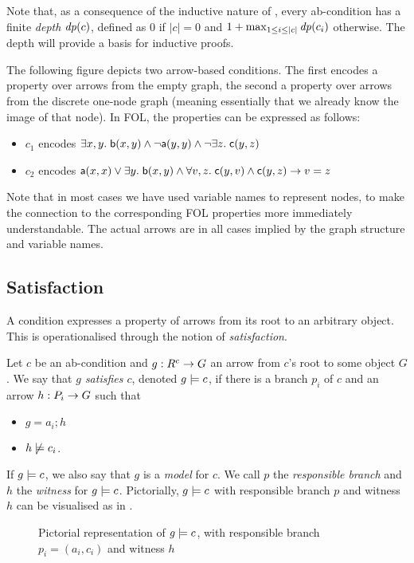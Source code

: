 Note that, as a consequence of the inductive nature of , every ab-condition has a finite \emph{depth} $\mathit{dp}(c)$, defined as $0$ if $|c|=0$ and $1+\max_{1\leq i\leq |c|} \mathit{dp}(c_i)$ otherwise. The depth will provide a basis for inductive proofs.

\begin{example}
The following figure depicts two arrow-based conditions. The first encodes a property over arrows from the empty graph, the second a property over arrows from the discrete one-node graph (meaning essentially that we already know the image of that node). In FOL, the properties can be expressed as follows:
\begin{itemize}
\item $c_1$ encodes $\exists x,y.\; \mathsf{b}(x,y) \wedge \neg \mathsf{a}(y,y)\wedge \neg \exists z.\; \mathsf{c}(y,z)$
\item $c_2$ encodes $\mathsf{a}(x,x)\vee \exists y.\; \mathsf{b}(x,y) \wedge \forall v,z.\; \mathsf{c}(y,v)\wedge \mathsf{c}(y,z) \rightarrow v=z$
\end{itemize}
Note that in most cases we have used variable names to represent nodes, to make the connection to the corresponding FOL properties more immediately understandable. The actual arrows are in all cases implied by the graph structure and variable names.
\begin{center}

\end{center}
\end{example}

\subsection{Satisfaction}

A condition expresses a property of arrows from its root to an arbitrary object. This is operationalised through the notion of \emph{satisfaction}.

\begin{definition}
  Let $c$ be an ab-condition and $g:R^c\rightarrow G$ an arrow from $c$'s root to some object $G$. We say that \emph{$g$ satisfies $c$}, denoted $g\models c$, if there is a branch $p_i$ of $c$ and an arrow $h:P_i\rightarrow G$ such that
  \begin{itemize}
  \item $g=a_i;h$
  \item $h\not\models c_i$.
  \end{itemize}
\end{definition}
%
If $g\models c$, we also say that $g$ is a \emph{model} for $c$. We call $p$ the \emph{responsible branch} and $h$ the \emph{witness} for $g\models c$. Pictorially, $g\models c$ with responsible branch $p$ and witness $h$ can be visualised as in .
%
\begin{figure}
  \centering
  
  \caption{Pictorial representation of $g\models c$, with responsible branch $p_i=(a_i,c_i)$ and witness $h$}
\end{figure}

